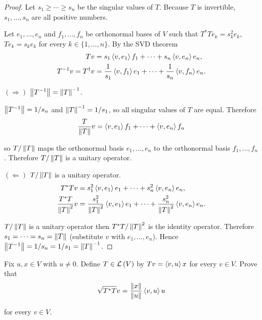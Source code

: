 \begin{proof}
    Let $s_{1}\geq \cdots \geq s_{n}$ be the singular values of $T$. Because $T$ is invertible, $s_{1}, \ldots, s_{n}$ are all positive numbers.

    Let $e_{1}, \ldots, e_{n}$ and $f_{1}, \ldots, f_{n}$ be orthonormal bases of $V$ such that $T^{*}Te_{k} = s_{k}^{2}e_{k}$, $Te_{k} = s_{k}e_{k}$ for every $k\in\{1,\ldots,n\}$. By the SVD theorem
    \begin{align*}
        Tv                     & = s_{1}\left\langle{v,e_{1}}\right\rangle f_{1} + \cdots + s_{n}\left\langle{v,e_{n}}\right\rangle e_{n},                     \\
        T^{-1}v = T^{\dagger}v & = \frac{1}{s_{1}}\left\langle{v,f_{1}}\right\rangle e_{1} + \cdots + \frac{1}{s_{n}}\left\langle{v,f_{n}}\right\rangle e_{n}.
    \end{align*}

    $(\Rightarrow)$ $\left\Vert{T^{-1}}\right\Vert = \left\Vert{T}\right\Vert^{-1}$.

    $\left\Vert{T^{-1}}\right\Vert = 1/s_{n}$ and $\left\Vert{T}\right\Vert^{-1} = 1/s_{1}$, so all singular values of $T$ are equal. Therefore
    \[
        \frac{T}{\left\Vert{T}\right\Vert}v = \left\langle{v,e_{1}}\right\rangle f_{1} + \cdots + \left\langle{v,e_{n}}\right\rangle f_{n}
    \]

    so $T/\left\Vert{T}\right\Vert$ maps the orthonormal basis $e_{1}, \ldots, e_{n}$ to the orthonormal basis $f_{1}, \ldots, f_{n}$. Therefore $T/\left\Vert{T}\right\Vert$ is a unitary operator.

    \bigskip
    $(\Leftarrow)$ $T/\left\Vert{T}\right\Vert$ is a unitary operator.
    \begin{align*}
        T^{*}Tv                      & = s_{1}^{2}\left\langle{v,e_{1}}\right\rangle e_{1} + \cdots + s_{n}^{2}\left\langle{v,e_{n}}\right\rangle e_{n},                                           \\
        \frac{T^{*}T}{\left\Vert{T}\right\Vert^{2}}v & = \frac{s_{1}^{2}}{\left\Vert{T}\right\Vert^{2}}\left\langle{v,e_{1}}\right\rangle e_{1} + \cdots + \frac{s_{n}^{2}}{\left\Vert{T}\right\Vert^{2}}\left\langle{v,e_{n}}\right\rangle e_{n}.
    \end{align*}

    $T/\left\Vert{T}\right\Vert$ is a unitary operator then $T^{*}T/\left\Vert{T}\right\Vert^{2}$ is the identity operator. Therefore $s_{1} = \cdots = s_{n} = \left\Vert{T}\right\Vert$ (substitute $v$ with $e_{1}, \ldots, e_{n}$). Hence $\left\Vert{T^{-1}}\right\Vert = 1/s_{n} = 1/s_{1} = \left\Vert{T}\right\Vert^{-1}$.
\end{proof}
\newpage

\begin{exercise}
    Fix $u, x\in V$ with $u\ne 0$. Define $T\in\mathcal{L}\left({V}\right)$ by $Tv = \left\langle{v, u}\right\rangle x$ for every $v\in V$. Prove that
    \[
        \sqrt{T^{*}T}v = \frac{\left\Vert{x}\right\Vert}{\left\Vert{u}\right\Vert}\left\langle{v, u}\right\rangle u
    \]

    for every $v\in V$.
\end{exercise}

